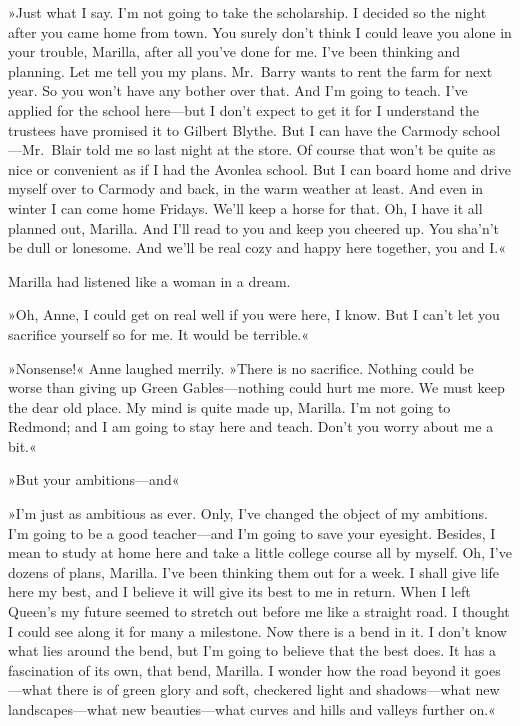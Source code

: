 »Just what I say. I'm not going to take the scholarship. I decided so the night after you came home from town. You surely don't think I could leave you alone in your trouble, Marilla, after all you've done for me. I've been thinking and planning. Let me tell you my plans. Mr.~Barry wants to rent the farm for next year. So you won't have any bother over that. And I'm going to teach. I've applied for the school here—but I don't expect to get it for I understand the trustees have promised it to Gilbert Blythe. But I can have the Carmody school—Mr.~Blair told me so last night at the store. Of course that won't be quite as nice or convenient as if I had the Avonlea school. But I can board home and drive myself over to Carmody and back, in the warm weather at least. And even in winter I can come home Fridays. We'll keep a horse for that. Oh, I have it all planned out, Marilla. And I'll read to you and keep you cheered up. You sha'n't be dull or lonesome. And we'll be real cozy and happy here together, you and I.«

Marilla had listened like a woman in a dream.

»Oh, Anne, I could get on real well if you were here, I know. But I can't let you sacrifice yourself so for me. It would be terrible.«

»Nonsense!« Anne laughed merrily. »There is no sacrifice. Nothing could be worse than giving up Green Gables—nothing could hurt me more. We must keep the dear old place. My mind is quite made up, Marilla. I'm not going to Redmond; and I am going to stay here and teach. Don't you worry about me a bit.«

»But your ambitions—and\longdash«

»I'm just as ambitious as ever. Only, I've changed the object of my ambitions. I'm going to be a good teacher—and I'm going to save your eyesight. Besides, I mean to study at home here and take a little college course all by myself. Oh, I've dozens of plans, Marilla. I've been thinking them out for a week. I shall give life here my best, and I believe it will give its best to me in return. When I left Queen's my future seemed to stretch out before me like a straight road. I thought I could see along it for many a milestone. Now there is a bend in it. I don't know what lies around the bend, but I'm going to believe that the best does. It has a fascination of its own, that bend, Marilla. I wonder how the road beyond it goes—what there is of green glory and soft, checkered light and shadows—what new landscapes—what new beauties—what curves and hills and valleys further on.«

